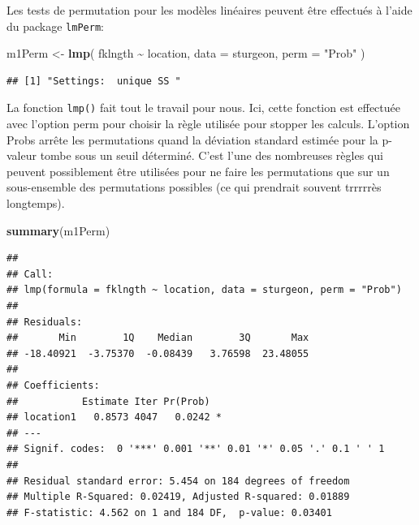 \documentclass[
  12pt,
]{book}
\newenvironment{Shaded}{\begin{snugshade}}{\end{snugshade}}
\newcommand{\DataTypeTok}[1]{\textcolor[rgb]{0.13,0.29,0.53}{#1}}
\newcommand{\KeywordTok}[1]{\textcolor[rgb]{0.13,0.29,0.53}{\textbf{#1}}}
\newcommand{\NormalTok}[1]{#1}
\newcommand{\OperatorTok}[1]{\textcolor[rgb]{0.81,0.36,0.00}{\textbf{#1}}}
\newcommand{\StringTok}[1]{\textcolor[rgb]{0.31,0.60,0.02}{#1}}
\begin{document}
Les tests de permutation pour les modèles linéaires peuvent être effectués à l'aide du package \texttt{lmPerm}:

\begin{Shaded}
\begin{Highlighting}[]
\NormalTok{m1Perm \textless{}{-}}\StringTok{ }\KeywordTok{lmp}\NormalTok{(}
\NormalTok{  fklngth }\OperatorTok{\textasciitilde{}}\StringTok{ }\NormalTok{location,}
  \DataTypeTok{data =}\NormalTok{ sturgeon,}
  \DataTypeTok{perm =} \StringTok{"Prob"}
\NormalTok{)}
\end{Highlighting}
\end{Shaded}

\begin{verbatim}
## [1] "Settings:  unique SS "
\end{verbatim}

La fonction \texttt{lmp()} fait tout le travail pour nous. Ici, cette fonction est effectuée avec l'option perm pour choisir la règle utilisée pour stopper les calculs. L'option Probs arrête les permutations quand la déviation standard estimée pour la p-valeur tombe sous un seuil déterminé. C'est l'une des nombreuses règles qui peuvent possiblement être utilisées pour ne faire les permutations que sur un sous-ensemble des permutations possibles (ce qui prendrait souvent trrrrrès longtemps).

\begin{Shaded}
\begin{Highlighting}[]
\KeywordTok{summary}\NormalTok{(m1Perm)}
\end{Highlighting}
\end{Shaded}

\begin{verbatim}
## 
## Call:
## lmp(formula = fklngth ~ location, data = sturgeon, perm = "Prob")
## 
## Residuals:
##       Min        1Q    Median        3Q       Max 
## -18.40921  -3.75370  -0.08439   3.76598  23.48055 
## 
## Coefficients:
##           Estimate Iter Pr(Prob)  
## location1   0.8573 4047   0.0242 *
## ---
## Signif. codes:  0 '***' 0.001 '**' 0.01 '*' 0.05 '.' 0.1 ' ' 1
## 
## Residual standard error: 5.454 on 184 degrees of freedom
## Multiple R-Squared: 0.02419, Adjusted R-squared: 0.01889 
## F-statistic: 4.562 on 1 and 184 DF,  p-value: 0.03401
\end{verbatim}
\end{document}
